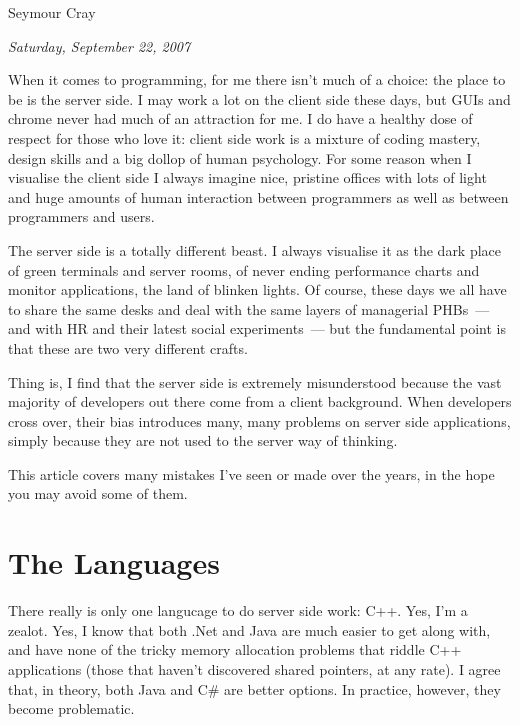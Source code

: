 \documentclass{memoir}
\begin{document}
\begin{epigraphs}
      {Seymour Cray}
\end{epigraphs}

\begin{flushright}
  \emph{Saturday, September 22, 2007}
\end{flushright}

When it comes to programming, for me there isn't much of a choice: the
place to be is the server side. I may work a lot on the client side
these days, but GUIs and chrome never had much of an attraction for
me. I do have a healthy dose of respect for those who love it: client
side work is a mixture of coding mastery, design skills and a big
dollop of human psychology. For some reason when I visualise the
client side I always imagine nice, pristine offices with lots of light
and huge amounts of human interaction between programmers as well as
between programmers and users.

The server side is a totally different beast. I always visualise it as
the dark place of green terminals and server rooms, of never ending
performance charts and monitor applications, the land of blinken
lights. Of course, these days we all have to share the same desks and
deal with the same layers of managerial PHBs~--- and with HR and their
latest social experiments~--- but the fundamental point is that these
are two very different crafts.

Thing is, I find that the server side is extremely misunderstood
because the vast majority of developers out there come from a client
background. When developers cross over, their bias introduces many,
many problems on server side applications, simply because they are not
used to the server way of thinking.

This article covers many mistakes I've seen or made over the years, in
the hope you may avoid some of them.

\section{The Languages}

There really is only one langucage to do server side work: C++. Yes,
I'm a zealot. Yes, I know that both .Net and Java are much easier to
get along with, and have none of the tricky memory allocation problems
that riddle C++ applications (those that haven't discovered shared
pointers, at any rate). I agree that, in theory, both Java and C\# are
better options. In practice, however, they become problematic.
\end{document}
